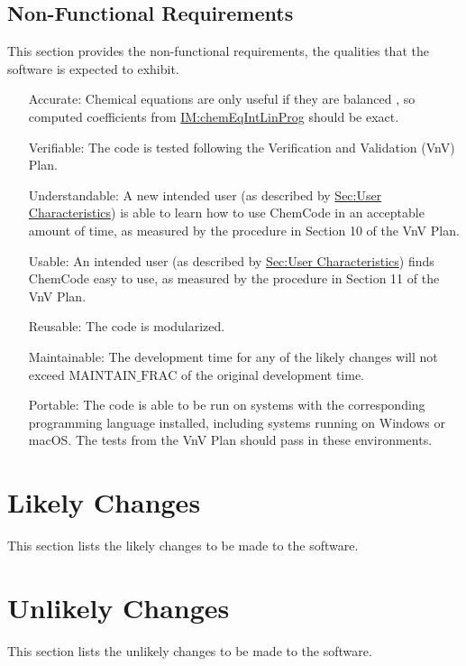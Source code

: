 \documentclass[12pt]{article}
\begin{document}
\subsection{Non-Functional Requirements}
\label{Sec:NFRs}
This section provides the non-functional requirements, the qualities that the software is expected to exhibit.

\begin{itemize}
\item[Accurate:\phantomsection\label{accurate}]{Chemical equations are only useful if they are balanced \cite{lund2023}, so computed coefficients from \hyperref[IM:chemEqIntLinProg]{IM:chemEqIntLinProg} should be exact.}
\item[Verifiable:\phantomsection\label{verifiable}]{The code is tested following the Verification and Validation (VnV) Plan.}
\item[Understandable:\phantomsection\label{understandable}]{A new intended user (as described by \hyperref[Sec:UserChars]{Sec:User Characteristics}) is able to learn how to use ChemCode in an acceptable amount of time, as measured by the procedure in Section 10 of the VnV Plan.}
\item[Usable:\phantomsection\label{usable}]{An intended user (as described by \hyperref[Sec:UserChars]{Sec:User Characteristics}) finds ChemCode easy to use, as measured by the procedure in Section 11 of the VnV Plan.}
\item[Reusable:\phantomsection\label{reusable}]{The code is modularized.}
\item[Maintainable:\phantomsection\label{maintainable}]{The development time for any of the likely changes will not exceed $\text{MAINTAIN_FRAC}$ of the original development time.}
\item[Portable:\phantomsection\label{portable}]{The code is able to be run on systems with the corresponding programming language installed, including systems running on Windows or macOS. The tests from the VnV Plan should pass in these environments.}
\end{itemize}
\section{Likely Changes}
\label{Sec:LCs}
This section lists the likely changes to be made to the software.

\section{Unlikely Changes}
\label{Sec:UCs}
This section lists the unlikely changes to be made to the software.
\end{document}
